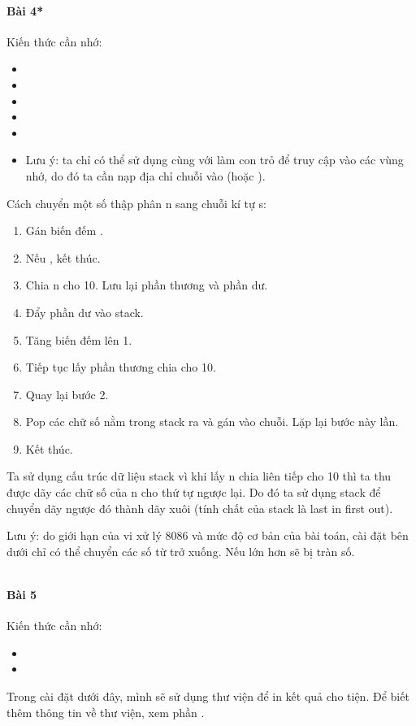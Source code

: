 \documentclass[main.tex]{subfiles}
\begin{document}
\paragraph*{Bài 4*}
Kiến thức cần nhớ:
\begin{itemize}
    \item {}
    \item {}
    \item {}
    \item {}
    \item {}
    \item {} \par Lưu ý: ta chỉ có thể sử dụng  cùng với  làm con trỏ để truy cập vào các vùng nhớ, do đó ta cần nạp địa chỉ chuỗi vào  (hoặc ).
\end{itemize}
Cách chuyển một số thập phân \cd n sang chuỗi kí tự \cd s:
\begin{enumerate}
    \item Gán biến đếm .
    \item Nếu , kết thúc.
    \item Chia \cd n cho 10. Lưu lại phần thương và phần dư.
    \item Đẩy phần dư vào stack.
    \item Tăng biến đếm lên 1.
    \item Tiếp tục lấy phần thương chia cho 10.\bigskip
    \item Quay lại bước 2.
    \item Pop các chữ số nằm trong stack ra và gán vào chuỗi. Lặp lại bước này  lần.
    \item Kết thúc.
\end{enumerate}
Ta sử dụng cấu trúc dữ liệu stack vì khi lấy \cd n chia liên tiếp cho 10 thì ta thu được dãy các chữ số của \cd n cho thứ tự ngược lại. Do đó ta sử dụng stack để chuyển dãy ngược đó thành dãy xuôi (tính chất của stack là last in first out).\par 
Lưu ý: do giới hạn của vi xử lý 8086 và mức độ cơ bản của bài toán, cài đặt bên dưới chỉ có thể chuyển các số từ  trở xuống. Nếu lớn hơn sẽ bị tràn số.

\inputminted[linenos,breaklines]{nasm}{answer_source/Bai4.asm}
\paragraph*{Bài 5}
Kiến thức cần nhớ:
\begin{itemize}
    \item {}
    \item {}
\end{itemize}
Trong cài đặt dưới đây, mình sẽ sử dụng thư viện  để in kết quả cho tiện. Để biết thêm thông tin về thư viện, xem phần .\\
\end{document}
